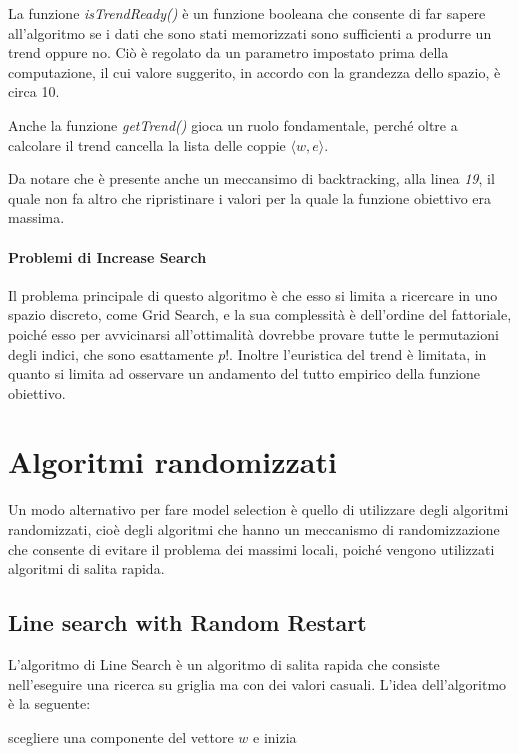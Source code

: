 La funzione \textit{isTrendReady()} è un funzione booleana
che consente di far sapere all'algoritmo se i dati che sono stati memorizzati
sono sufficienti a produrre un trend oppure no. Ciò è regolato da un
parametro impostato prima della computazione, il cui valore
suggerito, in accordo con la grandezza dello spazio, è circa 10.

Anche la funzione \textit{getTrend()} gioca un ruolo fondamentale,
perché oltre a calcolare il trend cancella la lista delle coppie
$\langle w, e\rangle$.

Da notare che è presente anche un meccansimo di backtracking,
alla linea \textit{19}, il quale non fa altro che ripristinare
i valori per la quale la funzione obiettivo era massima.

\paragraph{Problemi di Increase Search}
Il problema principale di questo algoritmo è che esso si limita a ricercare
in uno spazio discreto, come Grid Search, e la sua complessità è dell'ordine
del fattoriale, poiché esso per avvicinarsi all'ottimalità dovrebbe
provare tutte le permutazioni degli indici, che sono esattamente $p!$.
Inoltre l'euristica del trend è limitata, in quanto si limita
ad osservare un andamento del tutto empirico della funzione obiettivo.

\section{Algoritmi randomizzati}
Un modo alternativo per fare model selection è quello di utilizzare degli algoritmi randomizzati, cioè
degli algoritmi che hanno un meccanismo di randomizzazione che consente di evitare
il problema dei massimi locali, poiché vengono utilizzati algoritmi di salita rapida.

\subsection{Line search with Random Restart}
L'algoritmo di Line Search è un algoritmo di salita rapida che consiste nell'eseguire
una ricerca su griglia ma con dei valori casuali.
L'idea dell'algoritmo è la seguente:

scegliere una componente del vettore $w$ e inizia

